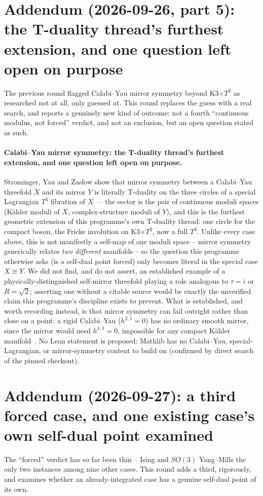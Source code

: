 \documentclass[11pt,a4paper]{article}
\begin{document}
\section*{Addendum (2026-09-26, part 5): the T-duality thread's furthest extension, and one question left
open on purpose}
The previous round flagged Calabi--Yau mirror symmetry beyond K3$\times T^2$ as researched not at all, only
guessed at. This round replaces the guess with a real search, and reports a genuinely new kind of outcome: not
a fourth ``continuous modulus, not forced'' verdict, and not an exclusion, but an open question stated as such.

\paragraph{Calabi--Yau mirror symmetry: the T-duality thread's furthest extension, and one question left open on
purpose.} Strominger, Yau and Zaslow show that mirror symmetry between a Calabi--Yau threefold $X$ and its
mirror $Y$ is literally T-duality on the three circles of a special Lagrangian $T^3$ fibration of
$X$~\cite{StromingerYauZaslow1996} -- the sector is the pair of continuous moduli spaces (K\"ahler moduli of
$X$, complex-structure moduli of $Y$), and this is the furthest geometric extension of this programme's own
T-duality thread: one circle for the compact boson, the Fricke involution on K3$\times T^2$, now a full $T^3$.
Unlike every case above, this is not manifestly a self-map of one moduli space -- mirror symmetry generically
relates \emph{two different} manifolds -- so the question this programme otherwise asks (is a self-dual point
forced) only becomes literal in the special case $X\cong Y$. We did not find, and do not assert, an established
example of a physically-distinguished self-mirror threefold playing a role analogous to $\tau=i$ or $R=\sqrt2$;
asserting one without a citable source would be exactly the unverified claim this programme's discipline exists
to prevent. What is established, and worth recording instead, is that mirror symmetry can fail outright rather
than close on a point: a rigid Calabi--Yau ($h^{2,1}=0$) has no ordinary smooth mirror, since the mirror would
need $h^{1,1}=0$, impossible for any compact K\"ahler manifold~\cite{CandelasDerrickParkes1993}. No Lean
statement is proposed: Mathlib has no Calabi--Yau, special-Lagrangian, or mirror-symmetry content to build on
(confirmed by direct search of the pinned checkout).

\section*{Addendum (2026-09-27): a third forced case, and one existing case's own self-dual point examined}
The ``forced'' verdict has so far been thin -- Ising and $SO(3)$ Yang--Mills the only two instances
among nine other cases. This round adds a third, rigorously, and examines whether an already-integrated
case has a genuine self-dual point of its own.
\end{document}
